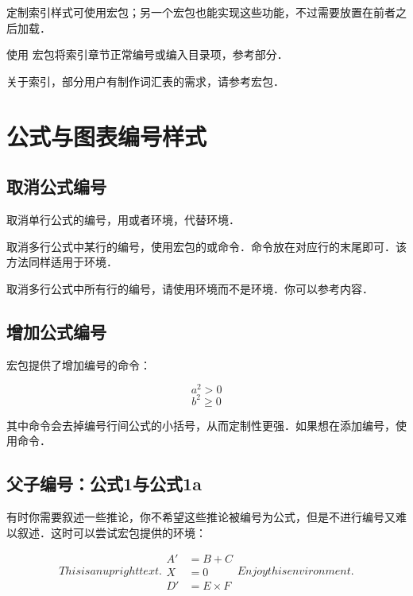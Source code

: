 定制索引样式可使用宏包；另一个宏包也能实现这些功能，不过需要放置在前者之后加载．

使用  宏包将索引章节正常编号或编入目录项，参考部分．

关于索引，部分用户有制作词汇表的需求，请参考宏包．

\section{公式与图表编号样式}
\subsection{取消公式编号}
取消单行公式的编号，用\latexline{[\char`\\]}或者环境，代替环境．

取消多行公式中某行的编号，使用宏包的或命令．命令放在对应行的末尾即可．该方法同样适用于环境．

取消多行公式中所有行的编号，请使用环境而不是环境．你可以参考内容．

\subsection{增加公式编号}
宏包提供了增加编号的命令：

\begin{codeshow}
\[a^2>0 \tag{$\star$}\]
\begin{equation}
b^2 \geqslant 0
\tag*{[Axiom]}
\end{equation}
\end{codeshow}

其中命令会去掉编号行间公式的小括号，从而定制性更强．如果想在添加编号，使用命令．

\subsection{父子编号：公式1与公式1a}
有时你需要叙述一些推论，你不希望这些推论被编号为公式，但是不进行编号又难以叙述．这时可以尝试宏包提供的环境：

\begin{codeshow}
\begin{subequations}
This is an upright text.
\begin{align}
A' &=B+C \\
X &=0 \nonumber \\
D' &=E \times F
\end{align}
Enjoy this environment.
\end{subequations}
\end{codeshow}

